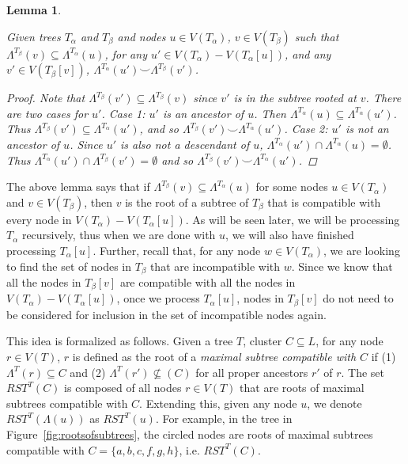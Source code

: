 \documentclass{article}
\newcommand{\compatible}{\smile}
\newcommand{\leafset}{\Lambda}
\newcommand{\TA}{T_\alpha}
\newcommand{\TB}{T_\beta}
\newtheorem{reconsideringcompatiblesubsets}[incompatibility]{Lemma}
\begin{document}
    \begin{reconsideringcompatiblesubsets}
        \label{lem:reconsideringcompatiblesubsets}

        Given trees $\TA$ and $\TB$ and nodes $u \in V(\TA)$, $v \in V(\TB)$ such that $\leafset^{\TB}(v) \subseteq \leafset^{\TA}(u)$, for any $u' \in V(\TA) - V(\TA[u])$, and any $v' \in V(\TB[v])$, $\leafset^{\TA}(u') \compatible \leafset^{\TB}(v')$.

        \begin{proof}
            Note that $\leafset^{\TB}(v') \subseteq \leafset^{\TB}(v)$ since $v'$ is in the subtree rooted at $v$. There are two cases for $u'$. \textit{Case 1}: $u'$ is an ancestor of $u$. Then $\leafset^{\TA}(u) \subseteq \leafset^{\TA}(u')$. Thus $\leafset^{\TB}(v') \subseteq \leafset^{\TA}(u')$, and so $\leafset^{\TB}(v') \compatible \leafset^{\TA}(u')$. \textit{Case 2}: $u'$ is not an ancestor of $u$. Since $u'$ is also not a descendant of $u$, $\leafset^{\TA}(u') \cap \leafset^{\TA}(u) = \emptyset$. Thus $\leafset^{\TA}(u') \cap \leafset^{\TB}(v') = \emptyset$ and so $\leafset^{\TB}(v') \compatible \leafset^{\TA}(u')$.
        \end{proof}
    \end{reconsideringcompatiblesubsets}

    The above lemma says that if $\leafset^{\TB}(v) \subseteq \leafset^{\TA}(u)$ for some nodes $u \in V(\TA)$ and $v \in V(\TB)$, then $v$ is the root of a subtree of $\TB$ that is compatible with every node in $V(\TA) - V(\TA[u])$. As will be seen later, we will be processing $\TA$ recursively, thus when we are done with $u$, we will also have finished processing $\TA[u]$. Further, recall that, for any node $w \in V(\TA)$, we are looking to find the set of nodes in $\TB$ that are incompatible with $w$. Since we know that all the nodes in $\TB[v]$ are compatible with all the nodes in $V(\TA) - V(\TA[u])$, once we process $\TA[u]$, nodes in $\TB[v]$ do not need to be considered for inclusion in the set of incompatible nodes again.

    This idea is formalized as follows. Given a tree $T$, cluster $C \subseteq L$, for any node $r \in V(T)$, $r$ is defined as the root of a \textit{maximal subtree compatible with $C$} if (1) $\leafset^T(r) \subseteq C$ and (2) $\leafset^T(r') \not\subseteq(C)$ for all proper ancestors $r'$ of $r$. The set $RST^{T}(C)$ is composed of all nodes $r \in V(T)$ that are roots of maximal subtrees compatible with $C$. Extending this, given any node $u$, we denote $RST^{T}(\leafset(u))$ as $RST^{T}(u)$. For example, in the tree in Figure~\ref{fig:rootsofsubtrees}, the circled nodes are roots of maximal subtrees compatible with $C = \{a, b, c, f, g, h\}$, i.e. $RST^{T}(C)$.
\end{document}
